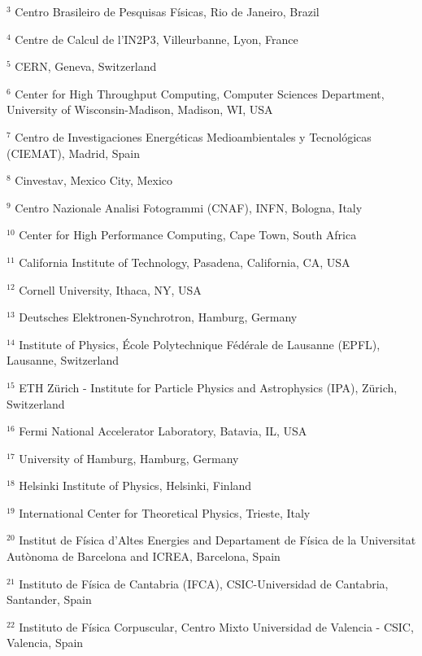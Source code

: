 \par {\footnotesize $^{3}$ Centro Brasileiro de Pesquisas Físicas, Rio de Janeiro, Brazil}
\par {\footnotesize $^{4}$ Centre de Calcul de l’IN2P3, Villeurbanne, Lyon, France}
\par {\footnotesize $^{5}$ CERN, Geneva, Switzerland}
\par {\footnotesize $^{6}$ Center for High Throughput  Computing, Computer Sciences Department, University of Wisconsin-Madison, Madison, WI, USA}
\par {\footnotesize $^{7}$ Centro de Investigaciones Energéticas Medioambientales y Tecnológicas (CIEMAT), Madrid, Spain}
\par {\footnotesize $^{8}$ Cinvestav, Mexico City, Mexico}
\par {\footnotesize $^{9}$ Centro Nazionale Analisi Fotogrammi (CNAF), INFN, Bologna, Italy}
\par {\footnotesize $^{10}$ Center for High Performance Computing, Cape Town, South Africa}
\par {\footnotesize $^{11}$ California Institute of Technology, Pasadena, California, CA, USA}
\par {\footnotesize $^{12}$ Cornell University, Ithaca, NY, USA}
\par {\footnotesize $^{13}$ Deutsches Elektronen-Synchrotron, Hamburg, Germany}
\par {\footnotesize $^{14}$ Institute of Physics, École Polytechnique Fédérale de Lausanne (EPFL), Lausanne, Switzerland}
\par {\footnotesize $^{15}$ ETH Zürich - Institute for Particle Physics and Astrophysics (IPA), Zürich, Switzerland}
\par {\footnotesize $^{16}$ Fermi National Accelerator Laboratory, Batavia, IL, USA}
\par {\footnotesize $^{17}$ University of Hamburg, Hamburg, Germany}
\par {\footnotesize $^{18}$ Helsinki Institute of Physics, Helsinki, Finland}
\par {\footnotesize $^{19}$ International Center for Theoretical Physics, Trieste, Italy}
\par {\footnotesize $^{20}$ Institut de Física d’Altes Energies and Departament de Física de la Universitat Autònoma de Barcelona and ICREA, Barcelona, Spain}
\par {\footnotesize $^{21}$ Instituto de Física de Cantabria (IFCA), CSIC-Universidad de Cantabria, Santander, Spain}
\par {\footnotesize $^{22}$ Instituto de Física Corpuscular, Centro Mixto Universidad de Valencia - CSIC, Valencia, Spain}
